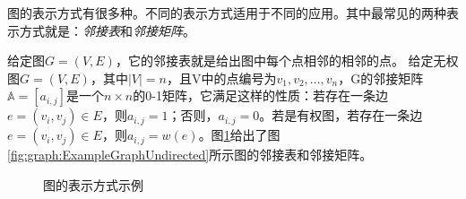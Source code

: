 图的表示方式有很多种。不同的表示方式适用于不同的应用。其中最常见的两种表示方式就是：\emph{邻接表}和\emph{邻接矩阵}。

给定图$G=(V,E)$，它的邻接表就是给出图中每个点相邻的相邻的点。
给定无权图$G=(V,E)$，其中$|V|=n$，且V中的点编号为$v_{1},v_2,...,v_{n}$，G的邻接矩阵$\mathbb{A}=[a_{i,j}]$是一个$n\times n$的0-1矩阵，它满足这样的性质：若存在一条边$e=(v_i,v_j)\in E$，则$a_{i,j}=1$；否则，$a_{i,j}=0$。若是有权图，若存在一条边$e=(v_i,v_j)\in E$，则$a_{i,j}=w(e)$。图\ref{fig:graph:ExampleGraphRepresentation}给出了图\ref{fig:graph:ExampleGraphUndirected}所示图的邻接表和邻接矩阵。

\begin{figure}[h]
   \centering
{}
       \hspace{0.05in}
 \caption{ 图的表示方式示例}%
\vspace{-0.2in}
 \label{fig:graph:ExampleGraphRepresentation}
\end{figure}


